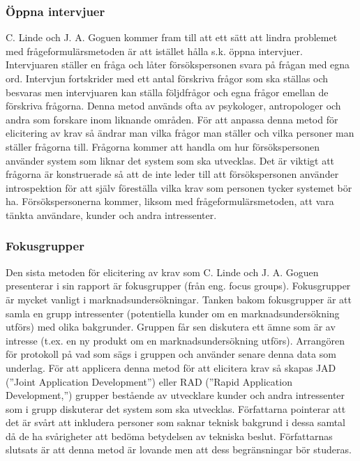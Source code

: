 \subsubsection{Öppna intervjuer} 
 C. Linde och J. A. Goguen kommer fram till att ett sätt att lindra problemet med frågeformulärsmetoden är att istället hålla s.k. öppna intervjuer. Intervjuaren ställer en fråga och låter försökspersonen svara på frågan med egna ord. Intervjun fortskrider med ett antal förskriva frågor som ska ställas och besvaras men intervjuaren kan ställa följdfrågor och egna frågor emellan de förskriva frågorna. Denna metod används ofta av psykologer, antropologer och andra som forskare inom liknande områden. För att anpassa denna metod för elicitering av krav så ändrar man vilka frågor man ställer och vilka personer man ställer frågorna till. Frågorna kommer att handla om hur försökspersonen använder system som liknar det system som ska utvecklas. Det är viktigt att frågorna är konstruerade så att de inte leder till att försökspersonen använder introspektion för att själv föreställa vilka krav som personen tycker systemet bör ha. Försökspersonerna kommer, liksom med frågeformulärsmetoden, att vara tänkta användare, kunder och andra intressenter. 

\subsubsection{Fokusgrupper}
Den sista metoden för elicitering av krav som C. Linde och J. A. Goguen presenterar i sin rapport är fokusgrupper (från eng. focus groups). Fokusgrupper är mycket vanligt i marknadsundersökningar. Tanken bakom fokusgrupper är att samla en grupp intressenter (potentiella kunder om en marknadsundersökning utförs) med olika bakgrunder. Gruppen får sen diskutera ett ämne som är av intresse (t.ex. en ny produkt om en marknadsundersökning utförs). Arrangören för protokoll på vad som sägs i gruppen och använder senare denna data som underlag.  För att applicera denna metod för att elicitera krav så skapas JAD (”Joint Application Development”) eller RAD (”Rapid Application Development,”) grupper bestående av utvecklare kunder och andra intressenter som i grupp diskuterar det system som ska utvecklas. Författarna pointerar att det är svårt att inkludera personer som saknar teknisk bakgrund i dessa samtal då de ha svårigheter att bedöma betydelsen av tekniska beslut. Författarnas slutsats är att denna metod är lovande men att dess begränsningar bör studeras. 

